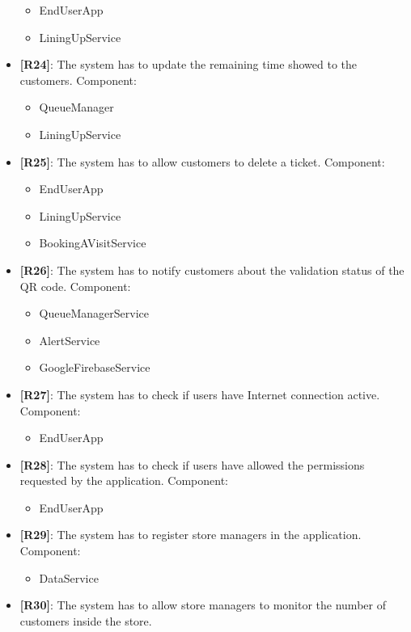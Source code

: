 \begin{itemize}
\begin{itemize}
        \item EndUserApp
        \item LiningUpService
    \end{itemize}
    \item {\textbf{[R24]}}: The system has to update the remaining time showed to the customers.
    Component:
    \begin{itemize}
        \item QueueManager
        \item LiningUpService
    \end{itemize}
    \item {\textbf{[R25]}}: The system has to allow customers to delete a ticket.
    Component:
    \begin{itemize}
        \item EndUserApp
        \item LiningUpService
        \item BookingAVisitService
    \end{itemize}
    \item {\textbf{[R26]}}: The system has to notify customers about the validation status of the QR code.
    Component:
    \begin{itemize}
        \item QueueManagerService
        \item AlertService
        \item GoogleFirebaseService
    \end{itemize}
    \item {\textbf{[R27]}}: The system has to check if users have Internet connection active.
    Component:
    \begin{itemize}
        \item EndUserApp
    \end{itemize}
    \item {\textbf{[R28]}}: The system has to check if users have allowed the permissions requested by the application.
    Component:
    \begin{itemize}
        \item EndUserApp
    \end{itemize}
    \item {\textbf{[R29]}}: The system has to register store managers in the application.
    Component:
    \begin{itemize}
        \item DataService
    \end{itemize}
    \item {\textbf{[R30]}}: The system has to allow store managers to monitor the number of customers inside the store.

\end{itemize}
